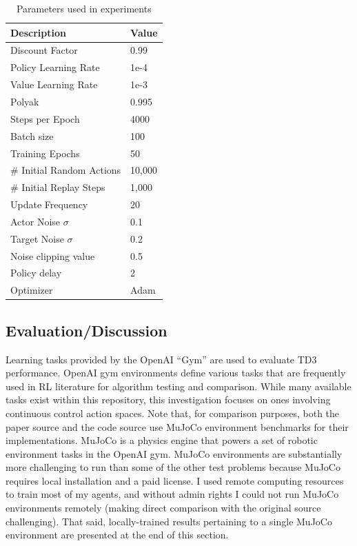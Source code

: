 \documentclass{article}
\begin{document}
\begin{table}
\centering
\caption{Parameters used in experiments}
\begin{tabular}{|p{5cm}|p{2cm}|}
\hline
Description & Value\\
\hline
Discount Factor & 0.99\\
Policy Learning Rate& 1e-4\\
Value Learning Rate& 1e-3\\
Polyak & 0.995\\
Steps per Epoch & 4000\\
Batch size & 100\\
Training Epochs & 50\\
\# Initial Random Actions & 10,000\\
\# Initial Replay Steps & 1,000\\
Update Frequency & 20\\
Actor Noise $\sigma$ & 0.1\\
Target Noise $\sigma$ & 0.2\\
Noise clipping value & 0.5\\
Policy delay & 2\\
Optimizer & Adam\\
\hline
\end{tabular}
\label{tab:hyperparams}
\end{table}

\subsection{Evaluation/Discussion} \label{sec:eval}

Learning tasks provided by the OpenAI ``Gym'' \cite{gym} are used to evaluate TD3 performance. OpenAI gym environments define various tasks that are frequently used in RL literature for algorithm testing and comparison. While many available tasks exist within this repository, this investigation focuses on ones involving continuous control action spaces. Note that, for comparison purposes, both the paper source \cite{td3} and the code source \cite{SpinningUp2018} use MuJoCo environment benchmarks for their implementations. MuJoCo is a physics engine that powers a set of robotic environment tasks in the OpenAI gym. MuJoCo environments are substantially more challenging to run than some of the other test problems because MuJoCo requires local installation and a paid license. I used remote computing resources to train most of my agents, and without admin rights I could not run MuJoCo environments remotely (making direct comparison with the original source challenging). That said, locally-trained results pertaining to a single MuJoCo environment are presented at the end of this section.
\end{document}

